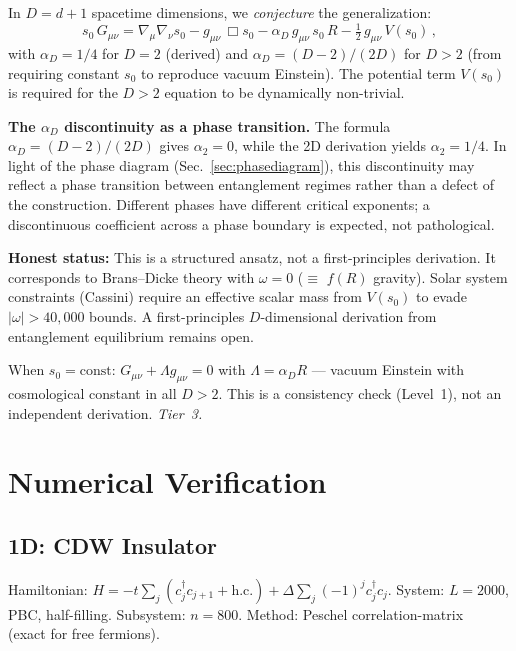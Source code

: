 \documentclass[aps,prd,twocolumn,superscriptaddress,nofootinbib,floatfix]{revtex4-2}
\newcommand{\sn}{s_0}
\newcommand{\aD}{\alpha_D}
\newcommand{\dAlem}{\Box}
\begin{document}
In $D = d{+}1$ spacetime dimensions, we \emph{conjecture} the generalization:
\begin{equation}
\label{eq:higherD}
\sn\,G_{\mu\nu} = \nabla_\mu\nabla_\nu\sn - g_{\mu\nu}\,\dAlem\sn - \aD\,g_{\mu\nu}\,\sn\,R - \tfrac{1}{2}\,g_{\mu\nu}\,V(\sn)\,,
\end{equation}
with $\aD = 1/4$ for $D = 2$ (derived) and $\aD = (D{-}2)/(2D)$ for $D > 2$ (from requiring constant $\sn$ to reproduce vacuum Einstein). The potential term $V(\sn)$ is required for the $D > 2$ equation to be dynamically non-trivial.

\textbf{The $\alpha_D$ discontinuity as a phase transition.} The formula $\aD = (D{-}2)/(2D)$ gives $\alpha_2 = 0$, while the 2D derivation yields $\alpha_2 = 1/4$. In light of the phase diagram (Sec.~\ref{sec:phasediagram}), this discontinuity may reflect a phase transition between entanglement regimes rather than a defect of the construction. Different phases have different critical exponents; a discontinuous coefficient across a phase boundary is expected, not pathological.

\textbf{Honest status:} This is a structured ansatz, not a first-principles derivation. It corresponds to Brans--Dicke theory with $\omega = 0$ ($\equiv$ $f(R)$ gravity). Solar system constraints (Cassini) require an effective scalar mass from $V(\sn)$ to evade $|\omega| > 40{,}000$ bounds. A first-principles $D$-dimensional derivation from entanglement equilibrium remains open.

When $\sn = \text{const}$: $G_{\mu\nu} + \Lambda g_{\mu\nu} = 0$ with $\Lambda = \aD R$ --- vacuum Einstein with cosmological constant in all $D > 2$. This is a consistency check (Level~1), not an independent derivation. \emph{Tier~3.}

\section{Numerical Verification}
\label{sec:numerics}

\subsection{1D: CDW Insulator}

Hamiltonian: $H = -t\sum_j(c_j^\dagger c_{j+1} + \text{h.c.}) + \Delta\sum_j(-1)^j c_j^\dagger c_j$. System: $L = 2000$, PBC, half-filling. Subsystem: $n = 800$. Method: Peschel correlation-matrix~\cite{Peschel2003} (exact for free fermions).
\end{document}
